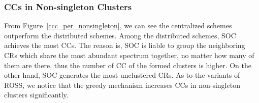 \documentclass[times]{ettauth}
\theoremstyle{mytheoremstyle}
\theoremstyle{mytheoremstyle}
\theoremstyle{mytheoremstyle}
\begin{document}
\subsubsection{CCs in Non-singleton Clusters}
\label{ccc_20}
From Figure~\ref{ccc_per_nonsingleton}, we can see the centralized schemes outperform the distributed schemes.
Among the distributed schemes, SOC achieves the most CCs.
The reason is, SOC is liable to group the neighboring CRs which share the most abundant spectrum together, no matter how many of them are there, thus the number of CC of the formed clusters is higher.
On the other hand, SOC generates the most unclustered CRs.
As to the variants of ROSS, we notice that the greedy mechanism increases CCs in non-singleton clusters significantly.

\end{document}
